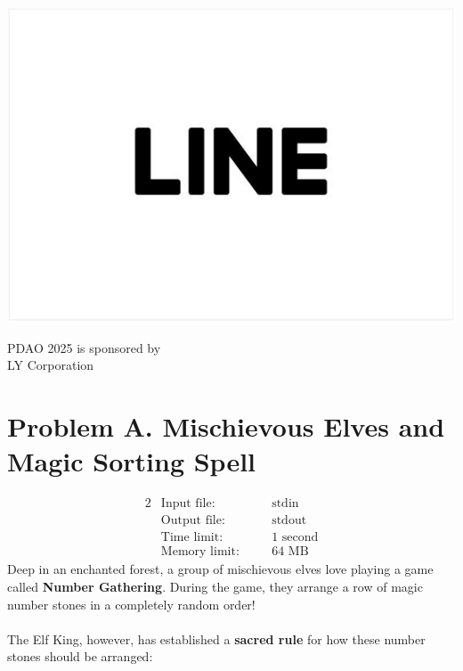 \documentclass[12pt,a4paper]{article}
\begin{document}
\begin{center}
\begin{minipage}{0.35\textwidth}
    \includegraphics[width=\linewidth]{Line.png}
\end{minipage}
\begin{minipage}{0.35\textwidth}
    PDAO 2025 is sponsored by \\ \textcopyright \space LY Corporation
\end{minipage}
\end{center}


\newpage
\section*{\fontsize{18}{12}Problem A. Mischievous Elves and Magic Sorting Spell}

\begin{alignat*} {2}
 &   \text{Input file:}   \quad     &&\text{stdin}\\
 &   \text{Output file:}  \quad     &&\text{stdout}\\
 &   \text{Time limit:}   \quad     &&\text{1 second}\\
 &   \text{Memory limit:} \quad     &&\text{64 MB}
\end{alignat*}
\noindent
Deep in an enchanted forest, a group of mischievous elves love playing a game called \textbf{Number Gathering}. During the game, they arrange a row of magic number stones in a completely random order!
\\\\
\noindent
The Elf King, however, has established a \textbf{sacred rule} for how these number stones should be arranged:
\end{document}
